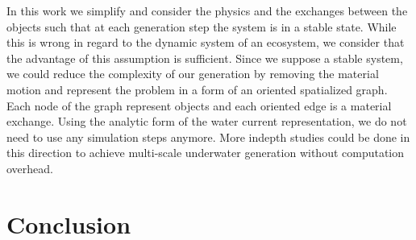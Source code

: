 \documentclass{egpubl}
\begin{document}
In this work we simplify and consider the physics and the exchanges between the objects such that at each generation step the system is in a stable state. While this is wrong in regard to the dynamic system of an ecosystem, we consider that the advantage of this assumption is sufficient. Since we suppose a stable system, we could reduce the complexity of our generation by removing the material motion and represent the problem in a form of an oriented spatialized graph. Each node of the graph represent objects and each oriented edge is a material exchange. Using the analytic form of the water current representation, we do not need to use any simulation steps anymore. 
More indepth studies could be done in this direction to achieve multi-scale underwater generation without computation overhead.

\section{Conclusion}

\def\url#1{} %




\end{document}

